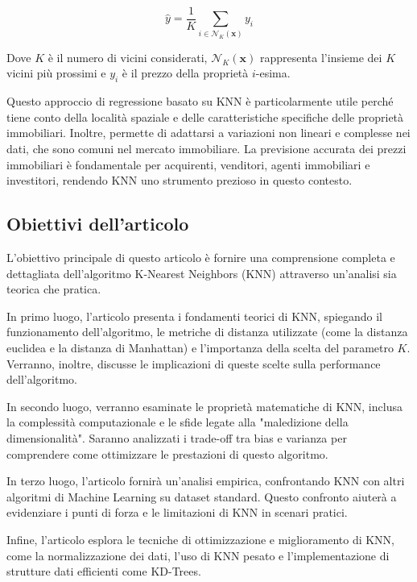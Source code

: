 \[
\hat{y} = \frac{1}{K} \sum_{i \in \mathcal{N}_K(\mathbf{x})} y_i
\]

Dove \( K \) è il numero di vicini considerati, \( \mathcal{N}_K(\mathbf{x}) \) rappresenta l'insieme dei \( K \) vicini più prossimi e \( y_i \) è il prezzo della proprietà $i$-esima.

Questo approccio di regressione basato su KNN è particolarmente utile perché tiene conto della località spaziale e delle caratteristiche specifiche delle proprietà immobiliari. Inoltre, permette di adattarsi a variazioni non lineari e complesse nei dati, che sono comuni nel mercato immobiliare. La previsione accurata dei prezzi immobiliari è fondamentale per acquirenti, venditori, agenti immobiliari e investitori, rendendo KNN uno strumento prezioso in questo contesto.

\subsection{Obiettivi dell'articolo}

L'obiettivo principale di questo articolo è fornire una comprensione completa e dettagliata 
dell'algoritmo K-Nearest Neighbors (KNN) attraverso un'analisi sia teorica che pratica.

In primo luogo, l'articolo presenta i fondamenti teorici di KNN, spiegando il funzionamento 
dell'algoritmo, le metriche di distanza utilizzate (come la distanza euclidea e la distanza di Manhattan) 
e l'importanza della scelta del parametro $K$. Verranno, inoltre, discusse le implicazioni di queste scelte 
sulla performance dell'algoritmo.

In secondo luogo, verranno esaminate le proprietà matematiche di KNN, inclusa la complessità 
computazionale e le sfide legate alla "maledizione della dimensionalità". Saranno analizzati i 
trade-off tra bias e varianza per comprendere come ottimizzare le prestazioni di questo algoritmo.

In terzo luogo, l'articolo fornirà un'analisi empirica, confrontando KNN con altri algoritmi 
di Machine Learning su dataset standard. Questo confronto aiuterà a evidenziare i punti di forza 
e le limitazioni di KNN in scenari pratici.

Infine, l'articolo esplora le tecniche di ottimizzazione e miglioramento di KNN, 
come la normalizzazione dei dati, l'uso di KNN pesato e l'implementazione di strutture 
dati efficienti come KD-Trees.